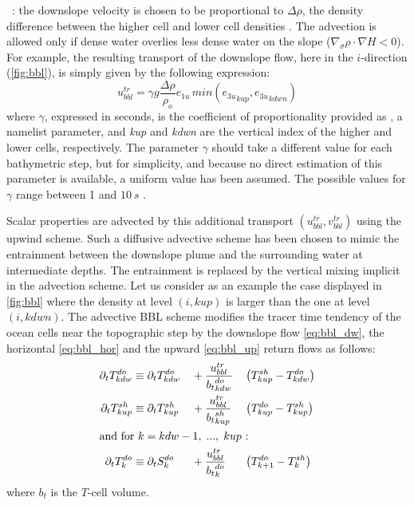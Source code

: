 \documentclass[../main/NEMO_manual]{subfiles}
\begin{document}
~:
the downslope velocity is chosen to be proportional to $\Delta \rho$,
the density difference between the higher cell and lower cell densities \citep{Campin_Goosse_Tel99}.
The advection is allowed only  if dense water overlies less dense water on the slope
(\ie $\nabla_\sigma \rho \cdot \nabla H < 0$).
For example, the resulting transport of the downslope flow, here in the $i$-direction (\autoref{fig:bbl}),
is simply given by the following expression:
\[
  u^{tr}_{bbl} = \gamma g \frac{\Delta \rho}{\rho_o} e_{1u} \, min ({e_{3u}}_{kup},{e_{3u}}_{kdwn})
\]
where $\gamma$, expressed in seconds, is the coefficient of proportionality provided as ,
a namelist parameter, and \textit{kup} and \textit{kdwn} are the vertical index of the higher and lower cells,
respectively.
The parameter $\gamma$ should take a different value for each bathymetric step, but for simplicity,
and because no direct estimation of this parameter is available, a uniform value has been assumed.
The possible values for $\gamma$ range between 1 and $10~s$ \citep{Campin_Goosse_Tel99}.

Scalar properties are advected by this additional transport $(u^{tr}_{bbl},v^{tr}_{bbl})$ using the upwind scheme.
Such a diffusive advective scheme has been chosen to mimic the entrainment between the downslope plume and
the surrounding water at intermediate depths.
The entrainment is replaced by the vertical mixing implicit in the advection scheme.
Let us consider as an example the case displayed in \autoref{fig:bbl} where
the density at level $(i,kup)$ is larger than the one at level $(i,kdwn)$.
The advective BBL scheme modifies the tracer time tendency of the ocean cells near the topographic step by
the downslope flow \autoref{eq:bbl_dw}, the horizontal \autoref{eq:bbl_hor} and
the upward \autoref{eq:bbl_up} return flows as follows: 
\begin{alignat}{3}
  \label{eq:bbl_dw}
  \partial_t T^{do}_{kdw} &\equiv \partial_t T^{do}_{kdw}
                                &&+ \frac{u^{tr}_{bbl}}{{b_t}^{do}_{kdw}} &&\left( T^{sh}_{kup} - T^{do}_{kdw} \right) \\
  \label{eq:bbl_hor}
  \partial_t T^{sh}_{kup} &\equiv \partial_t T^{sh}_{kup}
                                &&+ \frac{u^{tr}_{bbl}}{{b_t}^{sh}_{kup}} &&\left( T^{do}_{kup} - T^{sh}_{kup} \right) \\
  \intertext{and for $k =kdw-1,\;..., \; kup$ :}
  \label{eq:bbl_up}
  \partial_t T^{do}_{k} &\equiv \partial_t S^{do}_{k}
                                &&+ \frac{u^{tr}_{bbl}}{{b_t}^{do}_{k}}   &&\left( T^{do}_{k +1} - T^{sh}_{k}   \right)
\end{alignat}
where $b_t$ is the $T$-cell volume.
\end{document}

